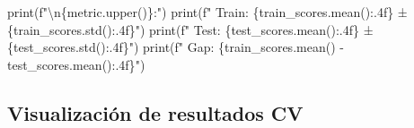 \documentclass[
  doc,
  floatsintext,
  longtable,
  a4paper,
  nolmodern,
  notxfonts,
  notimes,
  12pt,
  colorlinks=true,linkcolor=blue,citecolor=blue,urlcolor=blue]{apa7}
\newenvironment{Shaded}{\begin{snugshade}}{\end{snugshade}}
\newcommand{\BuiltInTok}[1]{\textcolor[rgb]{0.00,0.23,0.31}{#1}}
\newcommand{\CharTok}[1]{\textcolor[rgb]{0.13,0.47,0.30}{#1}}
\newcommand{\NormalTok}[1]{\textcolor[rgb]{0.00,0.23,0.31}{#1}}
\newcommand{\OperatorTok}[1]{\textcolor[rgb]{0.37,0.37,0.37}{#1}}
\newcommand{\SpecialCharTok}[1]{\textcolor[rgb]{0.37,0.37,0.37}{#1}}
\newcommand{\SpecialStringTok}[1]{\textcolor[rgb]{0.13,0.47,0.30}{#1}}
\begin{document}
\begin{Shaded}
\begin{Highlighting}[]
    \BuiltInTok{print}\NormalTok{(}\SpecialStringTok{f"}\CharTok{\textbackslash{}n}\SpecialCharTok{\{}\NormalTok{metric}\SpecialCharTok{.}\NormalTok{upper()}\SpecialCharTok{\}}\SpecialStringTok{:"}\NormalTok{)}
    \BuiltInTok{print}\NormalTok{(}\SpecialStringTok{f"  Train: }\SpecialCharTok{\{}\NormalTok{train\_scores}\SpecialCharTok{.}\NormalTok{mean()}\SpecialCharTok{:.4f\}}\SpecialStringTok{ ± }\SpecialCharTok{\{}\NormalTok{train\_scores}\SpecialCharTok{.}\NormalTok{std()}\SpecialCharTok{:.4f\}}\SpecialStringTok{"}\NormalTok{)}
    \BuiltInTok{print}\NormalTok{(}\SpecialStringTok{f"  Test:  }\SpecialCharTok{\{}\NormalTok{test\_scores}\SpecialCharTok{.}\NormalTok{mean()}\SpecialCharTok{:.4f\}}\SpecialStringTok{ ± }\SpecialCharTok{\{}\NormalTok{test\_scores}\SpecialCharTok{.}\NormalTok{std()}\SpecialCharTok{:.4f\}}\SpecialStringTok{"}\NormalTok{)}
    \BuiltInTok{print}\NormalTok{(}\SpecialStringTok{f"  Gap:   }\SpecialCharTok{\{}\NormalTok{train\_scores}\SpecialCharTok{.}\NormalTok{mean() }\OperatorTok{{-}}\NormalTok{ test\_scores}\SpecialCharTok{.}\NormalTok{mean()}\SpecialCharTok{:.4f\}}\SpecialStringTok{"}\NormalTok{)}
\end{Highlighting}
\end{Shaded}

\subsection{Visualización de resultados
CV}\label{visualizaciuxf3n-de-resultados-cv}
\end{document}
